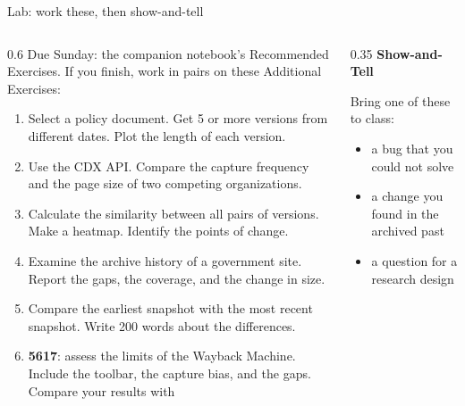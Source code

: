\documentclass[9pt,aspectratio=169]{beamer}
\begin{document}
\begin{frame}{Lab: work these, then show-and-tell}
    \begin{columns}
        \begin{column}{0.6\textwidth}
            Due Sunday: the companion notebook's Recommended Exercises. If you finish, work in pairs on these Additional Exercises:
            \begin{enumerate}\small
                \item Select a policy document. Get 5 or more versions from different dates. Plot the length of each version.
                \item Use the CDX API. Compare the capture frequency and the page size of two competing organizations.
                \item Calculate the similarity between all pairs of versions. Make a heatmap. Identify the points of change.
                \item Examine the archive history of a government site. Report the gaps, the coverage, and the change in size.
                \item Compare the earliest snapshot with the most recent snapshot. Write 200 words about the differences.
                \item[6.] \textbf{5617}: assess the limits of the Wayback Machine. Include the toolbar, the capture bias, and the gaps. Compare your results with \textcite{rogers2019doing}
            \end{enumerate}
        \end{column}
        \begin{column}{0.35\textwidth}
            \textbf{Show-and-Tell}\\[2pt]
            {\footnotesize Bring one of these to class:\par}
            \begin{itemize}\footnotesize
                \item a bug that you could not solve
                \item a change you found in the archived past
                \item a question for a research design
            \end{itemize}
        \end{column}
    \end{columns}
\end{frame}

\end{document}
